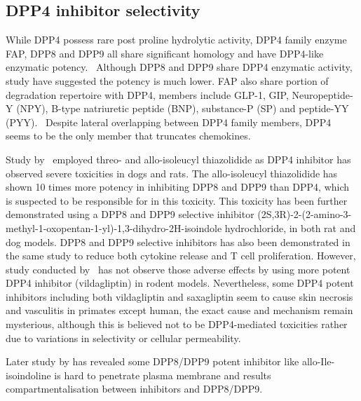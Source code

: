 \subsection{DPP4 inhibitor selectivity}
While DPP4 possess rare post proline hydrolytic activity, DPP4 family enzyme FAP, DPP8 and DPP9 all share significant homology and have DPP4-like enzymatic potency.~\cite{Kirby_2010,Thornberry_2007} Although DPP8 and DPP9 share DPP4 enzymatic activity, study have suggested the potency is much lower. FAP also share portion of degradation repertoire with DPP4, members include GLP-1, GIP, Neuropeptide-Y (NPY), B-type natriuretic peptide (BNP), substance-P (SP) and peptide-YY (PYY).~\cite{Keane_2011} Despite lateral overlapping between DPP4 family members, DPP4 seems to be the only member that truncates chemokines.~\cite{Keane_2011}  
\par 
Study by~\citet{Lankas2005} employed threo- and allo-isoleucyl thiazolidide as DPP4 inhibitor has observed severe toxicities in dogs and rats. The allo-isoleucyl thiazolidide has shown 10 times more potency in inhibiting DPP8 and DPP9 than DPP4, which is suspected to be responsible for in this toxicity. This toxicity has been further demonstrated using a DPP8 and DPP9 selective inhibitor (2S,3R)-2-(2-amino-3-methyl-1-oxopentan-1-yl)-1,3-dihydro-2H-isoindole hydrochloride, in both rat and dog models. DPP8 and DPP9 selective inhibitors has also been demonstrated in the same study to reduce both cytokine release and T cell proliferation. However, study conducted by~\citet{Burkey2008} has not observe those adverse effects by using more potent DPP4 inhibitor (vildagliptin) in rodent models. Nevertheless, some DPP4 potent inhibitors including both vildagliptin and saxagliptin seem to cause skin necrosis and vasculitis in primates except human, the exact cause and mechanism remain mysterious, although this is believed not to be DPP4-mediated toxicities rather due to variations in selectivity or cellular permeability.~\cite{Hoffmann2014} 
\par 
Later study by \citet{Bank2011} has revealed some DPP8/DPP9 potent inhibitor like allo-Ile-isoindoline is hard to penetrate plasma membrane and results compartmentalisation between inhibitors and DPP8/DPP9.  
